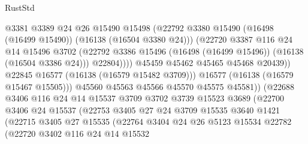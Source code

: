 \begin{lexlean}{RustStd}
\begin{coremodule}
                                @3381
                                @3389
                                @24
                                @26
                                @15490
                                @15498
                                (@22792
                                  @3380
                                  @15490
                                  (@16498 (@16499 @15490))
                                  (@16138 (@16504 @3380 @24)))
                                (@22720
                                  @3387
                                  @116
                                  @24
                                  @14
                                  @15496
                                  @3702
                                  (@22792
                                    @3386
                                    @15496
                                    (@16498 (@16499 @15496))
                                    (@16138 (@16504 @3386 @24)))
                                  @22804))))
                          @45459
                          @45462
                          @45465
                          @45468
                          @20439))
                      @22845
                      @16577
                      (@16138 (@16579 @15482 @3709)))
                    @16577
                    (@16138 (@16579 @15467 @15505)))
                  @45560
                  @45563
                  @45566
                  @45570
                  @45575
                  @45581))
              (@22688
                @3406
                @116
                @24
                @14
                @15537
                @3709
                @3702
                @3739
                @15523
                @3689
                (@22700
                  @3406
                  @24
                  @15537
                  (@22753
                    @3405
                    @27
                    @24
                    @3709
                    @15535
                    @3640
                    @1421
                    (@22715
                      @3405
                      @27
                      @15535
                      (@22764
                        @3404
                        @24
                        @26
                        @5123
                        @15534
                        @22782
                        (@22720
                          @3402
                          @116
                          @24
                          @14
                          @15532

\end{coremodule}
\end{lexlean}
